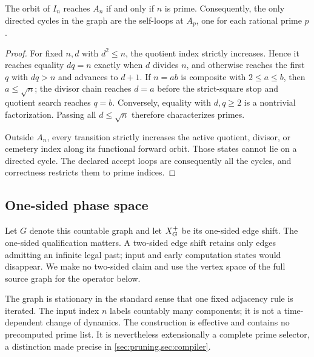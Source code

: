 \begin{theorem}
\label{thm:trial}
The orbit of $I_n$ reaches $A_n$ if and only if $n$ is prime.  Consequently,
the only directed cycles in the graph are the self-loops at $A_p$, one for
each rational prime $p$.
\end{theorem}

\begin{proof}
For fixed $n,d$ with $d^2\le n$, the quotient index strictly increases.
Hence it reaches equality $dq=n$ exactly when $d$ divides $n$, and otherwise
reaches the first $q$ with $dq>n$ and advances to $d+1$.  If $n=ab$ is
composite with $2\le a\le b$, then $a\le\sqrt n$; the divisor chain reaches
$d=a$ before the strict-square stop and quotient search reaches $q=b$.
Conversely, equality with $d,q\ge2$ is a nontrivial factorization.  Passing
all $d\le\sqrt n$ therefore characterizes primes.

Outside $A_n$, every transition strictly increases the active quotient,
divisor, or cemetery index along its functional forward orbit.  Those states
cannot lie on a directed cycle.  The declared accept loops are consequently
all the cycles, and correctness restricts them to prime indices.
\end{proof}

\subsection{One-sided phase space}

Let $G$ denote this countable graph and let $X_G^+$ be its one-sided edge
shift.  The one-sided qualification matters.  A two-sided edge shift retains
only edges admitting an infinite legal past; input and early computation
states would disappear.  We make no two-sided claim and use the vertex space
of the full source graph for the operator below.

The graph is stationary in the standard sense that one fixed adjacency rule
is iterated.  The input index $n$ labels countably many components; it is not
a time-dependent change of dynamics.  The construction is effective and
contains no precomputed prime list.  It is nevertheless extensionally a
complete prime selector, a distinction made precise in
\cref{sec:pruning,sec:compiler}.
